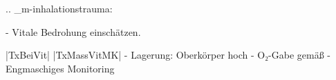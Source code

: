 
.. _m-inhalationstrauma:


\begin{itemize}
  -   Vitale Bedrohung einschätzen. \par
  |TxBeiVit| |TxMassVitMK|
  -   Lagerung: Oberkörper hoch
  -   O₂-Gabe gemäß 
  -   Engmaschiges Monitoring
\end{itemize}